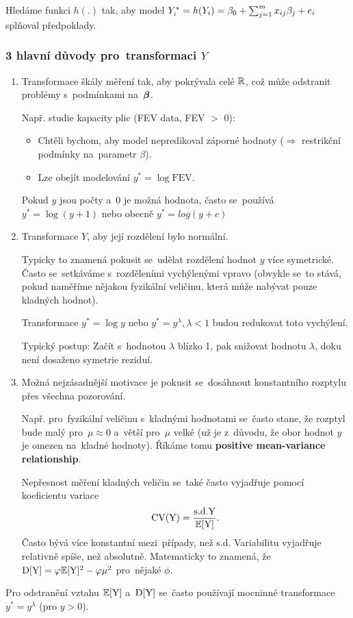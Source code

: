 Hledáme funkci $h(.)$ tak, aby model $Y_i^* = h(Y_i) = \beta_0 + \sum_{j=1}^{m} x_{ij} \beta_j + e_i$ splňoval předpoklady.

\subsubsection*{3 hlavní důvody pro~transformaci $Y$ }
\begin{enumerate}
	\item Transformace škály měření tak, aby pokrývala celé $\mathbb{R}$, což může odstranit problémy s~podmínkami na~$\boldsymbol{\beta}$.
	
	Např. studie kapacity plic (FEV data, FEV $>$ 0):
	\begin{itemize}
		\item Chtěli bychom, aby model nepredikoval záporné hodnoty ($\Rightarrow$ restrikční podmínky na~parametr $\beta$).
		\item Lze obejít modelování $y^* = \log \mathrm{FEV}$.
	\end{itemize}

	Pokud $y$ jsou počty a~0 je možná hodnota, často se~používá $y^* = \log (y+1)$ nebo obecně $y^* = log(y + c)$
	
	\item Transformace $Y$, aby její rozdělení bylo  normální.
	
	Typicky to znamená pokusit se~udělat rozdělení hodnot $y$ více symetrické. Často se~setkáváme s~rozděleními vychýlenými vpravo (obvykle se~to stává, pokud naměříme nějakou fyzikální veličinu, která může nabývat pouze kladných hodnot).
	
	Transformace $y^* = \log y$ nebo $y^* = y^{\lambda}, \lambda < 1$ budou redukovat toto vychýlení.
	
	Typický postup: Začít s~hodnotou $\lambda$ blízko 1, pak snižovat hodnotu $\lambda$, doku není dosaženo  symetrie reziduí.
	
	\item Možná nejzásadnější motivace je pokusit se~dosáhnout konstantního rozptylu přes všechna pozorování.
	
	Např. pro~fyzikální veličinu s~kladnými hodnotami se~často stane, že rozptyl bude malý pro~$\mu \approx 0$ a~větší pro~$\mu$ velké (už je z~důvodu, že obor hodnot $y$ je omezen na~kladné hodnoty). Říkáme tomu \textbf{positive mean-variance relationship}.
	
  Nepřesnost měření kladných veličin se~také často vyjadřuje pomocí koeficientu variace
 $$
 \text{CV}(\text{Y}) = \frac{\text{s.d.} \text{Y}}{\mathbb{E}[\text{Y}]}.
 $$
Často bývá více konstantní mezi~případy, než s.d. Variabilitu vyjadřuje relativně spíše, než absolutně. Matematicky to znamená, že $\mathrm{D}[\text{Y}] = \varphi \mathbb{E}[\text{Y}]^2 - \varphi \mu^2$ pro~nějaké $\phi$.

\end{enumerate}Pro odstranění vztahu $\mathbb{E} [\text{Y}]$ a~$\mathrm{D}[\text{Y}]$ se~často používají mocninné transformace $y^* = y^{\lambda}$ (pro $y > 0$).

